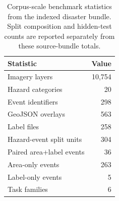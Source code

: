 \documentclass{article}
\newcommand{\datasetfiles}{10{,}754}
\newcommand{\datasetevents}{298}
\newcommand{\datasethazards}{20}
\newcommand{\datasetgeojson}{563}
\newcommand{\datasetlabels}{258}
\begin{document}
\begin{table}[ht]
    \centering
    \caption{Corpus-scale benchmark statistics from the indexed disaster bundle. Split composition and hidden-test counts are reported separately from these source-bundle totals.}
    \label{tab:corpus-stats}
    \begin{tabular}{lr}
        \toprule
        Statistic & Value \\
        \midrule
        Imagery layers & \datasetfiles{} \\
        Hazard categories & \datasethazards{} \\
        Event identifiers & \datasetevents{} \\
        GeoJSON overlays & \datasetgeojson{} \\
        Label files & \datasetlabels{} \\
        Hazard-event split units & 304 \\
        Paired area+label events & 36 \\
        Area-only events & 263 \\
        Label-only events & 5 \\
        Task families & 6 \\
        \bottomrule
    \end{tabular}
\end{table}
\end{document}
